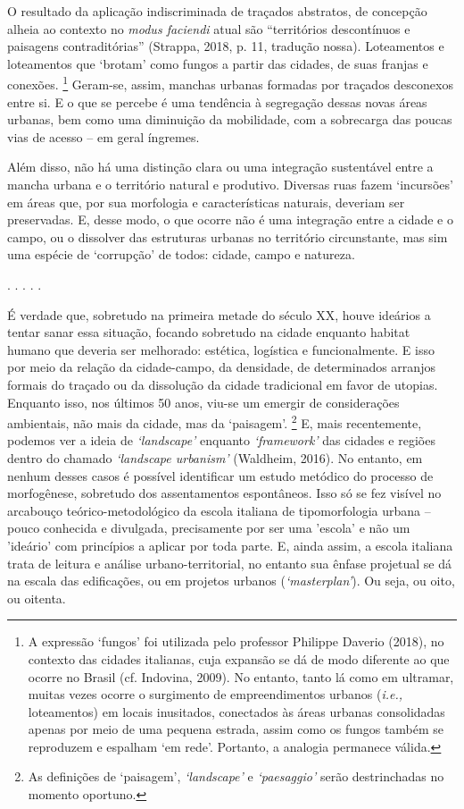\documentclass[12pt, a4paper]{book} %
\begin{document}
        O resultado da aplicação indiscriminada de traçados abstratos, de concepção alheia ao contexto no \textit{modus faciendi} atual são ``territórios descontínuos e paisagens contraditórias'' (Strappa, 2018, p. 11, tradução nossa). Loteamentos e loteamentos que `brotam' como fungos a partir das cidades, de suas franjas e conexões.
            \footnote[4]{A expressão `fungos' foi utilizada pelo professor Philippe Daverio (2018), no contexto das cidades italianas, cuja expansão se dá de modo diferente ao que ocorre no Brasil (cf. Indovina, 2009). No entanto, tanto lá como em ultramar, muitas vezes ocorre o surgimento de empreendimentos urbanos (\textit{i.e.,} loteamentos) em locais inusitados, conectados às áreas urbanas consolidadas apenas por meio de uma pequena estrada, assim como os fungos também se reproduzem e espalham `em rede'. Portanto, a analogia permanece válida.} 
        Geram-se, assim, manchas urbanas formadas por traçados desconexos entre si. E o que se percebe é uma tendência à segregação dessas novas áreas urbanas, bem como uma diminuição da mobilidade, com a sobrecarga das poucas vias de acesso – em geral íngremes.

        Além disso, não há uma distinção clara ou uma integração sustentável entre a mancha urbana e o território natural e produtivo. Diversas ruas fazem `incursões' em áreas que, por sua morfologia e características naturais, deveriam ser preservadas. E, desse modo, o que ocorre não é uma integração entre a cidade e o campo, ou o dissolver das estruturas urbanas no território circunstante, mas sim uma espécie de `corrupção' de todos: cidade, campo e natureza.

        \begin{center}
        . . . . . 
        \end{center}

        É verdade que, sobretudo na primeira metade do século XX, houve ideários a tentar sanar essa situação, focando sobretudo na cidade enquanto habitat humano que deveria ser melhorado: estética, logística e funcionalmente. E isso por meio da relação da cidade-campo, da densidade, de determinados arranjos formais do traçado ou da dissolução da cidade tradicional em favor de utopias. Enquanto isso, nos últimos 50 anos, viu-se um emergir de considerações ambientais, não mais da cidade, mas da `paisagem'.
            \footnote[5]{As definições de `paisagem', \textit{`landscape'} e \textit{`paesaggio'} serão destrinchadas no momento oportuno.} 
        E, mais recentemente, podemos ver a ideia de \textit{`landscape'} enquanto \textit{`framework'} das cidades e regiões dentro do chamado \textit{`landscape urbanism'} (Waldheim, 2016). No entanto, em nenhum desses casos é possível identificar um estudo metódico do processo de morfogênese, sobretudo dos assentamentos espontâneos. Isso só se fez visível no arcabouço teórico-metodológico da escola italiana de tipomorfologia urbana – pouco conhecida e divulgada, precisamente por ser uma 'escola' e não um 'ideário' com princípios a aplicar por toda parte. E, ainda assim, a escola italiana trata de leitura e análise urbano-territorial, no entanto sua ênfase projetual se dá na escala das edificações, ou em projetos urbanos (\textit{`masterplan'}). Ou seja, ou oito, ou oitenta.
\end{document}
